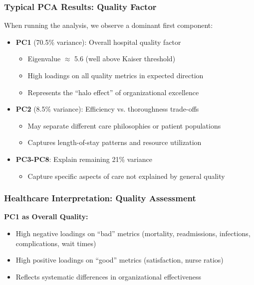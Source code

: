 \documentclass[aspectratio=169]{beamer}
\begin{document}
\begin{frame}
    \frametitle{Typical PCA Results: Quality Factor}
    When running the analysis, we observe a dominant first component:
    \begin{itemize}
        \item \textbf{PC1} (70.5\% variance): Overall hospital quality factor \pause
              \begin{itemize}
                  \item Eigenvalue $\approx$ 5.6 (well above Kaiser threshold) \pause
                  \item High loadings on all quality metrics in expected direction \pause
                  \item Represents the ``halo effect'' of organizational excellence \pause
              \end{itemize}
        \item \textbf{PC2} (8.5\% variance): Efficiency vs. thoroughness trade-offs \pause
              \begin{itemize}
                  \item May separate different care philosophies or patient populations \pause
                  \item Captures length-of-stay patterns and resource utilization \pause
              \end{itemize}
        \item \textbf{PC3-PC8}: Explain remaining 21\% variance \pause
              \begin{itemize}
                  \item Capture specific aspects of care not explained by general quality \pause
              \end{itemize}
    \end{itemize}
\end{frame}

\begin{frame}
    \frametitle{Healthcare Interpretation: Quality Assessment}
    \textbf{PC1 as Overall Quality:}
    \begin{itemize}
        \item High negative loadings on ``bad'' metrics (mortality, readmissions, infections, complications, wait times) \pause
        \item High positive loadings on ``good'' metrics (satisfaction, nurse ratios) \pause
        \item Reflects systematic differences in organizational effectiveness \pause
    \end{itemize}
\end{frame}
\end{document}
